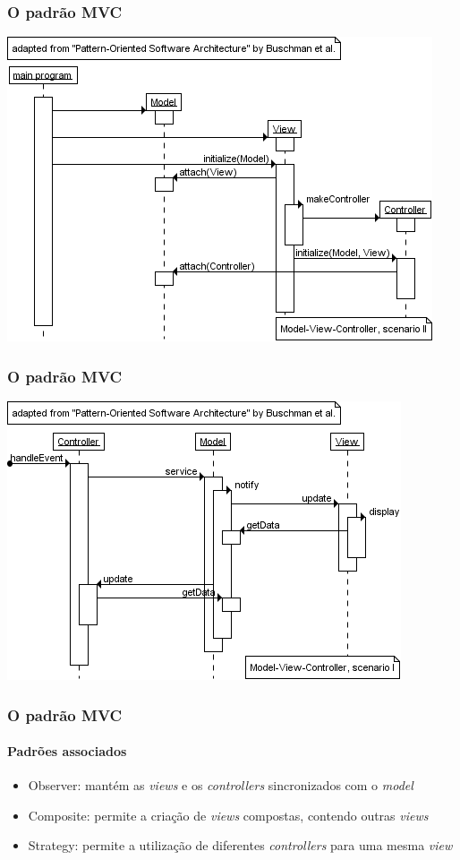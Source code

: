 \documentclass{beamer}
\begin{document}
\begin{frame}
\frametitle{O padrão MVC}
\begin{center}
	\includegraphics[scale=0.6]{MVCScenario.png}
\end{center}
\end{frame}

\begin{frame}
\frametitle{O padrão MVC}
\begin{center}
	\includegraphics[scale=0.6]{MVCHandleEvent.png}
\end{center}
\end{frame}

\begin{frame}
\frametitle{O padrão MVC}
\framesubtitle{Padrões associados}
\begin{itemize}
	\item Observer: mantém as \textit{views} e os \textit{controllers} sincronizados com o \textit{model}
	\item Composite: permite a criação de \textit{views} compostas, contendo outras \textit{views}
	\item Strategy: permite a utilização de diferentes \textit{controllers} para uma mesma \textit{view}
\end{itemize}
\end{frame}
\end{document}
